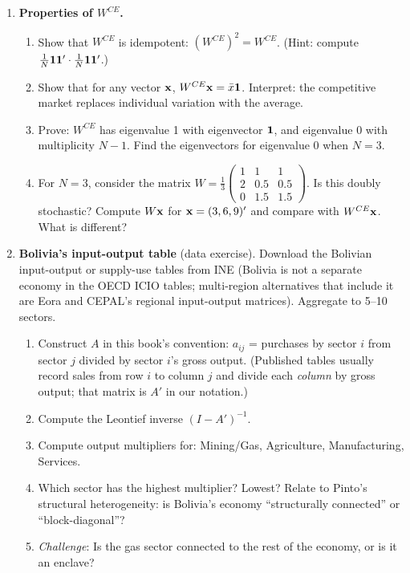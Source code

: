 \documentclass[../structural_economics_book.tex]{subfiles}
\begin{document}
\begin{enumerate}[label=\textbf{1.\arabic*}, leftmargin=3em]
\item \textbf{Properties of $W^{CE}$.}
\begin{enumerate}
\item Show that $W^{CE}$ is idempotent: $(W^{CE})^2 = W^{CE}$. (Hint: compute $\frac{1}{N}\mathbf{1}\mathbf{1}' \cdot \frac{1}{N}\mathbf{1}\mathbf{1}'$.)
\item Show that for any vector $\mathbf{x}$, $W^{CE}\mathbf{x} = \bar{x}\mathbf{1}$. Interpret: the competitive market replaces individual variation with the average.
\item Prove: $W^{CE}$ has eigenvalue 1 with eigenvector $\mathbf{1}$, and eigenvalue 0 with multiplicity $N-1$. Find the eigenvectors for eigenvalue 0 when $N = 3$.
\item For $N = 3$, consider the matrix $W = \frac{1}{3}\begin{pmatrix} 1 & 1 & 1 \\ 2 & 0.5 & 0.5 \\ 0 & 1.5 & 1.5 \end{pmatrix}$. Is this doubly stochastic? Compute $W\mathbf{x}$ for $\mathbf{x} = (3, 6, 9)'$ and compare with $W^{CE}\mathbf{x}$. What is different?
\end{enumerate}

\item \textbf{Bolivia's input-output table} (data exercise). Download the Bolivian input-output or supply-use tables from INE (Bolivia is not a separate economy in the OECD ICIO tables; multi-region alternatives that include it are Eora and CEPAL's regional input-output matrices). Aggregate to 5--10 sectors.
\begin{enumerate}
\item Construct $A$ in this book's convention: $a_{ij}$ = purchases by sector $i$ from sector $j$ divided by sector $i$'s gross output. (Published tables usually record sales from row $i$ to column $j$ and divide each \textit{column} by gross output; that matrix is $A'$ in our notation.)
\item Compute the Leontief inverse $(I - A')^{-1}$.
\item Compute output multipliers for: Mining/Gas, Agriculture, Manufacturing, Services.
\item Which sector has the highest multiplier? Lowest? Relate to Pinto's structural heterogeneity: is Bolivia's economy ``structurally connected'' or ``block-diagonal''?
\item \textit{Challenge}: Is the gas sector connected to the rest of the economy, or is it an enclave?
\end{enumerate}


\end{enumerate}
\end{document}
